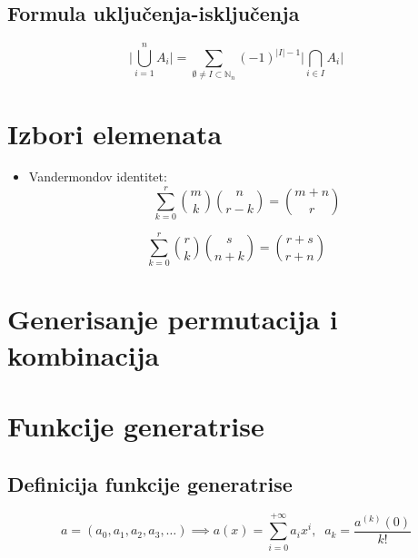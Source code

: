 \documentclass[a4paper,12pt,twoside]{report}
\numberwithin{algorithm}{section}
\begin{document}
\subsection{Formula uključenja-isključenja}
\[\bigg|\bigcup_{i=1}^n A_i\bigg| = \sum_{\emptyset \not = I \subset \mathbb{N}_n}{} (-1)^{|I| - 1} \bigg|\bigcap_{i \in I} A_i\bigg|\]
\section{Izbori elemenata}
\begin{itemize}
    \item Vandermondov identitet:
    \[
        \sum_{k = 0}^{r} {{m} \choose {k}} {{n} \choose {r - k}} = {{m + n} \choose {r}}
        \]
\end{itemize}
    \[ \sum_{k = 0}^{r} {{r} \choose {k}} {{s} \choose {n + k}} = {{r + s} \choose {r + n}} \]
    \section{Generisanje permutacija i kombinacija}

\section{Funkcije generatrise}
\subsection{Definicija funkcije generatrise}
\[a = (a_0, a_1, a_2, a_3, \dots) \implies a(x) = \sum_{i = 0}^{+\infty} a_i x^i, \;\; a_k = \frac{a^{(k)}(0)}{k!}\]
\end{document}
